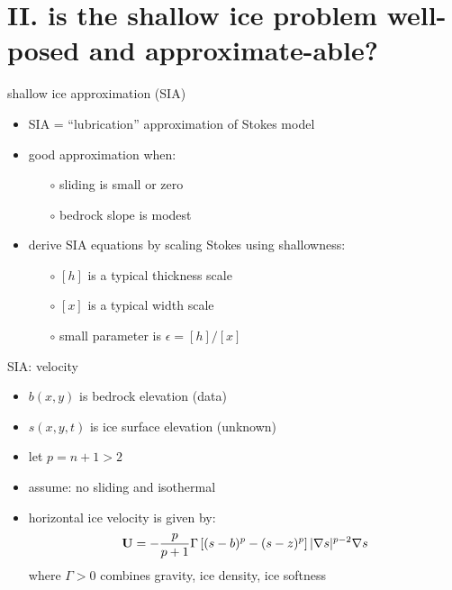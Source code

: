 \documentclass[hide notes,intlimits]{beamer}
\newcommand{\eps}{\epsilon}
\begin{document}
\section[shallow ice well-posed?]{II. is the shallow ice problem well-posed and approximate-able?}


\begin{frame}{shallow ice approximation (SIA)}

\begin{itemize}
\item SIA = ``lubrication'' approximation of Stokes model
\item good approximation when:
  \begin{itemize}
  \item[$\circ$] sliding is small or zero
  \item[$\circ$] bedrock slope is modest
  \end{itemize}
\item derive SIA equations by scaling Stokes using shallowness:
  \begin{itemize}
  \item[$\circ$] $[h]$ is a typical thickness scale
  \item[$\circ$] $[x]$ is a typical width scale
  \item[$\circ$] small parameter is $\eps = [h] / [x]$
  \end{itemize}
\end{itemize}
\end{frame}


\begin{frame}{SIA: velocity}
 
\begin{itemize}
\item $b(x,y)$ is bedrock elevation (data)
\item $s(x,y,t)$ is ice surface elevation (unknown)
\item let $p=n+1>2$
\item assume: no sliding and isothermal
\item horizontal ice velocity is given by: 
  $${\bf U}  =  - \frac{p}{p+1} \Gamma \left[ (s-b)^p - (s - z)^p  \right] 
|\nabla s |^{p-2} \nabla s$$
where $\Gamma > 0$ combines gravity, ice density, ice softness
\end{itemize}
\end{frame}
\end{document}
